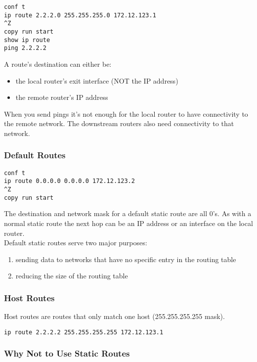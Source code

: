 \begin{verbatim}
conf t
ip route 2.2.2.0 255.255.255.0 172.12.123.1
^Z
copy run start
show ip route
ping 2.2.2.2
\end{verbatim}

A route's destination can either be:

\begin{itemize}
\item the local router's exit interface (NOT the IP address)
\item the remote router's IP address
\end{itemize}

When you send pings it's not enough for the local router to have connectivity
to the remote network. The downstream routers also need connectivity to that
network.\\

\subsubsection{Default Routes}

\begin{verbatim}
conf t
ip route 0.0.0.0 0.0.0.0 172.12.123.2
^Z
copy run start
\end{verbatim}

The destination and network mask for a default static route are all 0's.
As with a normal static route the next hop can be an IP address or an
interface on the local router.\\

Default static routes serve two major purposes:

\begin{enumerate}
\item sending data to networks that have no specific entry in the routing
table
\item reducing the size of the routing table
\end{enumerate}

\subsubsection{Host Routes}

Host routes are routes that only match one host (255.255.255.255 mask).

\begin{verbatim}
ip route 2.2.2.2 255.255.255.255 172.12.123.1
\end{verbatim}

\subsubsection{Why Not to Use Static Routes}

